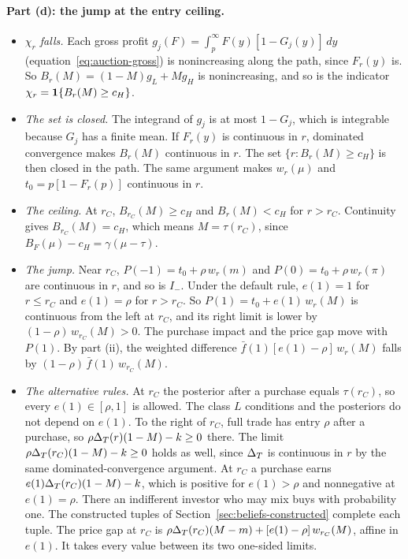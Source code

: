 \paragraph{Part (d): the jump at the entry ceiling.}
\begin{itemize}
\item \emph{\(\chi_r\) falls.} Each gross profit \(g_j(F)=\int_p^\infty F(y)[1-G_j(y)]\,dy\) (equation~\eqref{eq:auction-gross}) is nonincreasing along the path, since \(F_r(y)\) is. So \(B_r(M)=(1-M)g_L+Mg_H\) is nonincreasing, and so is the indicator \(\chi_r=\mathbf{1}\{B_r(M)\ge c_H\}\).
\item \emph{The set is closed.} The integrand of \(g_j\) is at most \(1-G_j\), which is integrable because \(G_j\) has a finite mean. If \(F_r(y)\) is continuous in \(r\), dominated convergence makes \(B_r(M)\) continuous in \(r\). The set \(\{r:B_r(M)\ge c_H\}\) is then closed in the path. The same argument makes \(w_r(\mu)\) and \(t_0=p[1-F_r(p)]\) continuous in \(r\).
\item \emph{The ceiling.} At \(r_C\), \(B_{r_C}(M)\ge c_H\) and \(B_r(M)<c_H\) for \(r>r_C\). Continuity gives \(B_{r_C}(M)=c_H\), which means \(M=\tau(r_C)\), since \(B_F(\mu)-c_H=\gamma(\mu-\tau)\).
\item \emph{The jump.} Near \(r_C\), \(P(-1)=t_0+\rho\,w_r(m)\) and \(P(0)=t_0+\rho\,w_r(\pi)\) are continuous in \(r\), and so is \(I_-\). Under the default rule, \(e(1)=1\) for \(r\le r_C\) and \(e(1)=\rho\) for \(r>r_C\). So \(P(1)=t_0+e(1)\,w_r(M)\) is continuous from the left at \(r_C\), and its right limit is lower by \((1-\rho)\,w_{r_C}(M)>0\). The purchase impact and the price gap move with \(P(1)\). By part (ii), the weighted difference \(\bar f(1)[e(1)-\rho]\,w_r(M)\) falls by \((1-\rho)\,\bar f(1)\,w_{r_C}(M)\).
\item \emph{The alternative rules.} At \(r_C\) the posterior after a purchase equals \(\tau(r_C)\), so every \(e(1)\in[\rho,1]\) is allowed. The class \(L\) conditions and the posteriors do not depend on \(e(1)\). To the right of \(r_C\), full trade has entry \(\rho\) after a purchase, so \(\rho\Delta_T(r)(1-M)-k\ge0\) there. The limit \(\rho\Delta_T(r_C)(1-M)-k\ge0\) holds as well, since \(\Delta_T\) is continuous in \(r\) by the same dominated-convergence argument. At \(r_C\) a purchase earns \(e(1)\Delta_T(r_C)(1-M)-k\), which is positive for \(e(1)>\rho\) and nonnegative at \(e(1)=\rho\). There an indifferent investor who may mix buys with probability one. The constructed tuples of Section~\ref{sec:beliefs-constructed} complete each tuple. The price gap at \(r_C\) is \(\rho\Delta_T(r_C)(M-m)+[e(1)-\rho]\,w_{r_C}(M)\), affine in \(e(1)\). It takes every value between its two one-sided limits.
\end{itemize}

